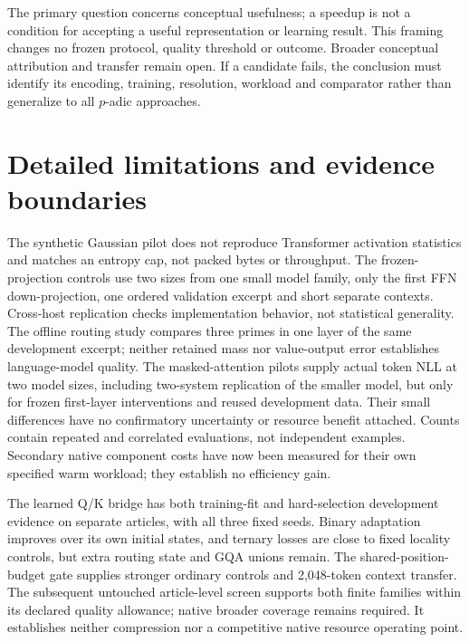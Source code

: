 \documentclass[11pt]{article}
\begin{document}
The primary question concerns conceptual usefulness; a speedup is not a
condition for accepting a useful representation or learning result.
This framing changes no frozen protocol, quality threshold or outcome.
Broader conceptual attribution and transfer remain open. If a candidate
fails, the conclusion must identify its encoding, training, resolution,
workload and comparator rather than generalize to all \(p\)-adic approaches.


\section{Detailed limitations and evidence boundaries}

The synthetic Gaussian pilot does not reproduce Transformer activation
statistics and matches an entropy cap, not packed bytes or throughput.
The frozen-projection controls use two sizes from one small model family, only
the first FFN down-projection, one ordered validation excerpt and short separate
contexts. Cross-host replication checks
implementation behavior, not statistical generality. The offline routing
study compares three primes in one layer of the same development excerpt;
neither retained mass nor value-output error establishes language-model quality.
The masked-attention pilots supply actual token NLL at two model sizes,
including two-system replication of the smaller model, but only for frozen
first-layer interventions and reused development data. Their small differences
have no confirmatory uncertainty or resource benefit attached.
Counts contain repeated and correlated evaluations, not independent examples.
Secondary native component costs have now been measured for their own
specified warm workload; they establish no efficiency gain.

The learned Q/K bridge has both training-fit and hard-selection development
evidence on separate articles, with all three fixed seeds. Binary adaptation
improves over its own initial states, and ternary losses are close to fixed
locality controls, but extra routing state and GQA unions remain. The shared-position-budget gate supplies stronger ordinary controls and
2,048-token context transfer. The subsequent untouched article-level screen
supports both finite families within its declared quality allowance; native
broader coverage remains required. It establishes
neither compression nor a competitive native resource operating point.
\end{document}
